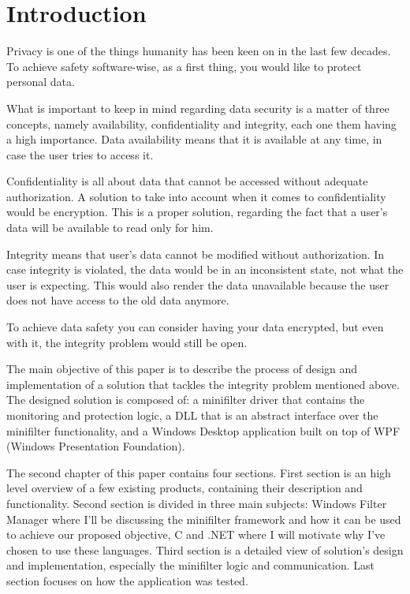 \chapter{Introduction}
	Privacy is one of the things humanity has been keen on in the last few decades. To achieve safety software-wise, as a first thing, you would like to protect personal data. 
	
	What is important to keep in mind regarding data security is a matter of three concepts, namely availability, confidentiality and integrity, each one them having a high importance. Data availability means that it is available at any time, in case the user tries to access it.
	
	Confidentiality is all about data that cannot be accessed without adequate authorization. A solution to take into account when it comes to confidentiality would be encryption. This is a proper solution, regarding the fact that a user's data will be available to read only for him.
	
	Integrity means that user's data cannot be modified without authorization. In case integrity is violated, the data would be in an inconsistent state, not what the user is expecting. This would also render the data unavailable because the user does not have access to the old data anymore.
	
	To achieve data safety you can consider having your data encrypted, but even with it, the integrity problem would still be open.   
	
	The main objective of this paper is to describe the process of design and implementation of a solution that tackles the integrity problem mentioned above. The designed solution is composed of: a minifilter driver that contains the monitoring and protection logic, a DLL that is an abstract interface over the minifilter functionality, and a Windows Desktop application built on top of WPF (Windows Presentation Foundation). 
	
	The second chapter of this paper contains four sections. First section is an high level overview of a few existing products, containing their description and functionality. Second section is divided in three main subjects: Windows Filter Manager where I'll be discussing the minifilter framework and how it can be used to achieve our proposed objective, C and .NET where I will motivate why I've chosen to use these languages. Third section is a detailed view of solution's design and implementation, especially the minifilter logic and communication. Last section focuses on how the application was tested.
	
